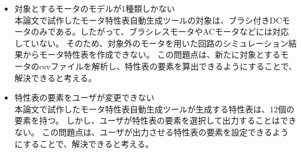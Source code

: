 \begin{itemize}
	\item 対象とするモータのモデルが1種類しかない\\
      本論文で試作したモータ特性表自動生成ツールの対象は、ブラシ付きDCモータのみである。したがって、ブラシレスモータやACモータなどには対応していない。
      そのため、対象外のモータを用いた回路のシミュレーション結果からモータ特性表を作成できない。
		  この問題点は、新たに対象とするモータのcsvファイルを解析し、特性表の要素を算出できるようにすることで、解決できると考える。

  \item 特性表の要素をユーザが変更できない\\
        本論文で試作したモータ特性表自動生成ツールが生成する特性表は、12個の要素を持つ。
        しかし、ユーザが特性表の要素を選択して出力することはできない。
        この問題点は、ユーザが出力させる特性表の要素を設定できるようにすることで、解決できると考える。



\end{itemize}







